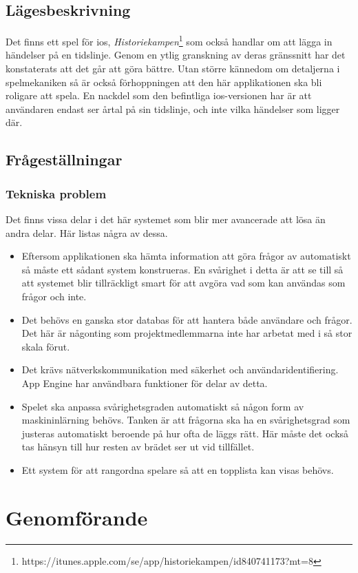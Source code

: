 \documentclass[12pt,a4paper]{article}
\begin{document}
\subsection{Lägesbeskrivning}
Det finns ett spel för ios, \textit{Historiekampen}\footnote{https://itunes.apple.com/se/app/historiekampen/id840741173?mt=8} som också handlar om att lägga in händelser på en tidslinje. Genom en ytlig granskning av deras gränssnitt har det konstaterats att det går att göra bättre. Utan större kännedom om detaljerna i spelmekaniken så är också förhoppningen att den här applikationen ska bli roligare att spela. En nackdel som den befintliga ios-versionen har är att användaren endast ser årtal på sin tidslinje, och inte vilka händelser som ligger där.
\subsection{Frågeställningar}
\subsubsection{Tekniska problem}
Det finns vissa delar i det här systemet som blir mer avancerade att lösa än andra delar. Här listas några av dessa.
\begin{itemize}
\item Eftersom applikationen ska hämta information att göra frågor av automatiskt så måste ett sådant system konstrueras. En svårighet i detta är att se till så att systemet blir tillräckligt smart för att avgöra vad som kan användas som frågor och inte.
\item Det behövs en ganska stor databas för att hantera både användare och frågor. Det här är någonting som projektmedlemmarna inte har arbetat med i så stor skala förut.
\item Det krävs nätverkskommunikation med säkerhet och användaridentifiering. App Engine har användbara funktioner för delar av detta.
\item Spelet ska anpassa svårighetsgraden automatiskt så någon form av maskininlärning behövs. Tanken är att frågorna ska ha en svårighetsgrad som justeras automatiskt beroende på hur ofta de läggs rätt. Här måste det också tas hänsyn till hur resten av brädet ser ut vid tillfället.
\item Ett system för att rangordna spelare så att en topplista kan visas behövs.
\end{itemize}
\section{Genomförande}
\end{document}
